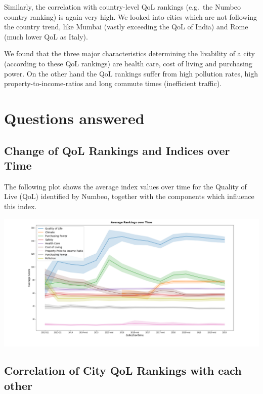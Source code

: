 \documentclass[
  twocolumn]{article}
\begin{document}
Similarly, the correlation with country-level QoL rankings (e.g.~the
Numbeo country ranking) is again very high. We looked into cities which
are not following the country trend, like Mumbai (vastly exceeding the
QoL of India) and Rome (much lower QoL as Italy).

We found that the three major characteristics determining the livability
of a city (according to these QoL rankings) are health care, cost of
living and purchasing power. On the other hand the QoL rankings suffer
from high pollution rates, high property-to-income-ratios and long
commute times (inefficient traffic).

\hypertarget{questions-answered}{%
\section{Questions answered}\label{questions-answered}}

\hypertarget{change-of-qol-rankings-and-indices-over-time}{%
\subsection{Change of QoL Rankings and Indices over
Time}\label{change-of-qol-rankings-and-indices-over-time}}

The following plot shows the average index values over time for the
Quality of Live (QoL) identified by Numbeo, together with the components
which influence this index.

\includegraphics[width=1\linewidth]{visuals/RankingsOverTime}

\hypertarget{correlation-of-city-qol-rankings-with-each-other}{%
\subsection{Correlation of City QoL Rankings with each
other}\label{correlation-of-city-qol-rankings-with-each-other}}
\end{document}
